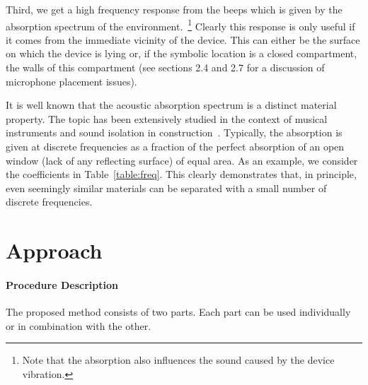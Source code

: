  Third, we get a high frequency response from the beeps which
is given by the absorption spectrum of the environment.~\footnote{Note that the absorption also influences the sound caused by the device vibration.}
Clearly this response is only useful if it comes from the immediate
vicinity of the device. This can either be the surface on which the
device is lying or, if the symbolic location is a closed compartment, the
walls of this compartment (see sections 2.4 and 2.7 for a discussion of
microphone placement issues). 

\begin{table}[ht]
\caption[Frequencies and material absorption spectrum]{Frequencies and their absorption by the selected material, given as a fraction of perfect absorption\cite{olson1967mpa}.}
\centering
{}
\label{table:freq} 
\end{table}
 
It is well known that the acoustic absorption spectrum is a distinct
material property. The topic has been extensively studied in the
context of musical instruments and sound isolation in
construction~\cite{olson1967mpa}. Typically, the absorption is given at discrete
frequencies as a fraction of the perfect absorption of an open window
(lack of any reflecting surface) of equal area.
As an example, we consider the coefficients in Table~\ref{table:freq}.
This clearly demonstrates that, in principle, even seemingly similar materials
can be separated with a small number of discrete frequencies. 

\section{Approach}
\label{sec:approach}
\paragraph{Procedure Description}
The proposed method consists of two parts. Each part can be used
individually or in combination with the other.

